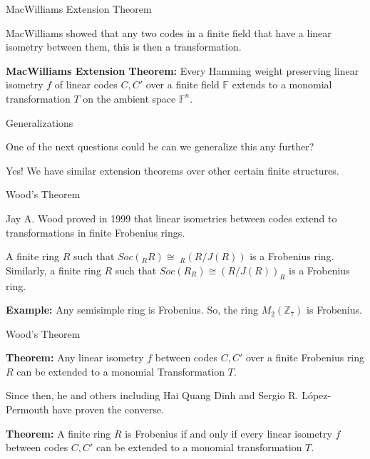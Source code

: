 \documentclass{beamer}
\begin{document}
\begin{frame}{MacWilliams Extension Theorem}

    MacWilliams showed that any two codes in a finite field that have a linear isometry between them,
    this is then a transformation.

    \bigskip
    
    \textbf{MacWilliams Extension Theorem:} Every Hamming weight preserving linear isometry $f$ of
    linear codes $C,C'$ over a finite field $\mathbb{F}$ extends to a monomial transformation $T$ on the
    ambient space $\mathbb{F}^n$.

\end{frame}

\begin{frame}{Generalizations}
    
    One of the next questions could be can we generalize this any further?

    \bigskip

    \pause

    Yes! We have similar extension theorems over other certain finite structures.

\end{frame}

\begin{frame}{Wood's Theorem}
    
    Jay A. Wood proved in 1999 that linear isometries between codes extend to transformations in
    finite Frobenius rings.

    \bigskip

    A finite ring $R$ such that $Soc(_RR)\cong\;_R(R/J(R))$ is a Frobenius ring. Similarly, a finite
    ring $R$ such that $Soc(R_R)\cong(R/J(R))_R$ is a Frobenius ring.

    \bigskip

    \pause

    \textbf{Example:} Any semisimple ring is Frobenius. So, the ring $M_2(\mathbb{Z}_7)$ is Frobenius.

\end{frame}

\begin{frame}{Wood's Theorem}

    \textbf{Theorem:} Any linear isometry $f$ between codes $C,C'$ over a finite Frobenius ring $R$ can
    be extended to a monomial Transformation $T$.

    \bigskip

    \pause
    
    Since then, he and others including Hai Quang Dinh and Sergio R. L\'{o}pez-Permouth have proven
    the converse.

    \bigskip

    \pause

    \textbf{Theorem:} A finite ring $R$ is Frobenius if and only if every linear isometry $f$ between
    codes $C,C'$ can be extended to a monomial transformation $T$.

\end{frame}
\end{document}
